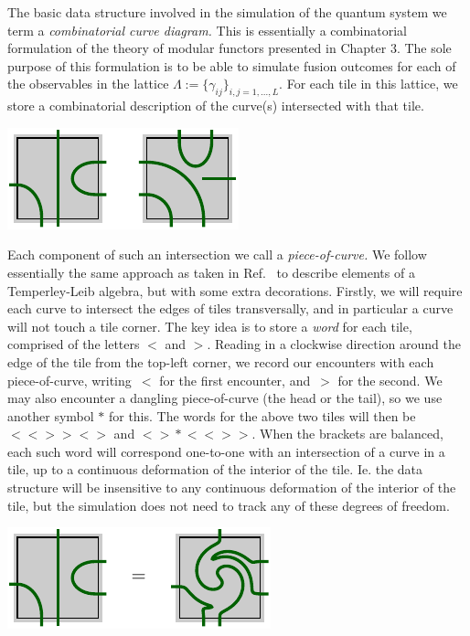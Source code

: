 The basic data structure involved in the
simulation of the quantum system
we term a \emph{combinatorial curve diagram.}
This is essentially a combinatorial formulation of the
theory of modular functors presented in Chapter 3.
The sole purpose of this formulation is to
be able to simulate fusion outcomes for each of the observables in the
lattice $\Lambda := \bigl\{ \gamma_{ij} \bigr\}_{i,j=1,...,L}.$
For each tile in this lattice,
we store a combinatorial
description of the curve(s) intersected with that tile.
\begin{center}
\includegraphics[]{pic-cells.pdf}
\end{center}
Each component of such an intersection we call a \emph{piece-of-curve.}
We follow essentially the same approach as taken in Ref.~\cite{Abramsky2007} 
to describe elements of a Temperley-Leib algebra, but
with some extra decorations.
Firstly, we will require each curve to intersect 
the edges of tiles transversally,
and in particular a curve will not touch a tile corner.
The key idea is to store a \emph{word} for each tile, comprised of
the letters $\bigl<$ and $\bigr>$.
Reading in a clockwise direction around the edge of
the tile from the top-left corner,
we record our encounters with each piece-of-curve,
writing~$\bigl<$ for the first encounter, and~$\bigr>$ for the
second.
We may also encounter a dangling piece-of-curve
(the head or the tail), so we use another symbol $*$ for this.
The words for the above two tiles will then be 
$\bigl<\bigl<\bigr>\bigr>\bigl<\bigr>$ and $\bigl<\bigr>*\bigl<\bigl<\bigr>\bigr>.$
When the brackets are balanced,
each such word will correspond one-to-one with an intersection
of a curve in a tile, up to a continuous deformation of the interior of the tile.
Ie. the data structure 
will be insensitive to any continuous deformation of the interior of the tile,
but the simulation does not need to track any of these degrees of freedom.

\begin{center}
\includegraphics[]{pic-cells-0.pdf}
\end{center}

